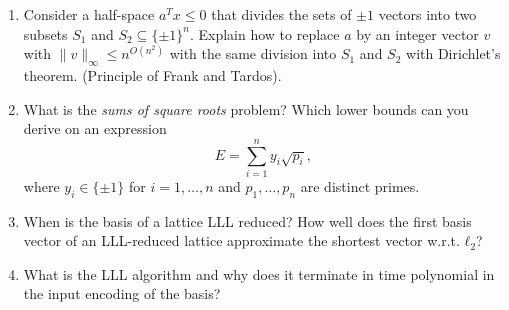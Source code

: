 \documentclass[a4paper,11pt,american]{article}
\theoremstyle{plain}
\theoremstyle{definition}
\begin{document}
\begin{enumerate}
\item Consider a half-space $ a^T x ≤ 0$  that divides the sets of $\pm1$ vectors into two subsets $S_1$ and $S_2⊆ \{\pm 1\}^n$. Explain how to replace $a$ by an integer vector $v$ with $\|v\|_∞  ≤ n^{O(n^2)}$ with the same division into $S_1$ and $S_2$ with Dirichlet's theorem. (Principle of Frank and Tardos).
\item What is the \emph{sums of square roots} problem? Which lower bounds can you derive on an expression
  \begin{displaymath}
    E = ∑_{i=1}^n y_i \sqrt{p_i}, 
  \end{displaymath}
  where $y_i ∈ \{\pm 1\}$ for $i=1,\dots,n$ and $p_1,\dots,p_n$ are distinct primes.
\item When is the basis of a lattice LLL reduced? How well does the first basis vector of an LLL-reduced lattice approximate the shortest vector w.r.t. $ℓ_2$?
\item What is the LLL algorithm and why does it terminate in time polynomial in the input encoding of the basis? 
\end{enumerate}




\end{document}
